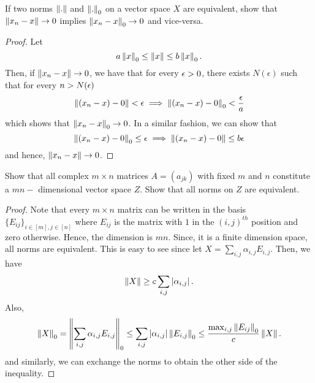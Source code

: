     \begin{question}
        If two norms $\left\lVert . \right\rVert$ and $\left\lVert . \right\rVert_0$ on a vector space $X$ are equivalent, show that $\left\lVert x_n - x \right\rVert \rightarrow 0$ implies $\left\lVert x_n - x \right\rVert_0 \rightarrow 0$ and vice-versa.
        \label{section2.4-9}
    \end{question}
    \begin{proof}
        Let
        \[a \left\lVert x \right\rVert_0 \leq \left\lVert x \right\rVert \leq b \left\lVert x \right\rVert_0.\]
        Then, if $\left\lVert x_n  -x \right\rVert \rightarrow 0$, we have that for every $\epsilon > 0$, there exists $N(\epsilon)$ such that for every $n > N(\epsilon)$
        \[\left\lVert (x_n-x) - 0 \right\rVert < \epsilon \implies \left\lVert (x_n-x) - 0 \right\rVert_0 < \frac{\epsilon}{a}\]
        which shows that $\left\lVert x_n - x \right\rVert_0 \rightarrow 0$. In a similar fashion, we can show that
        \[\left\lVert (x_n-x) - 0 \right\rVert_0 \leq \epsilon \implies \left\lVert (x_n - x) - 0 \right\rVert \leq b\epsilon\]
         and hence, $\left\lVert x_n - x \right\rVert \rightarrow 0$.
         
\end{proof}

\begin{question}
    Show that all complex $m \times n$ matrices $A = (a_{jk})$ with fixed $m$ and $n$ constitute a $mn-$ dimensional vector space $Z$. Show that all norms on $Z$ are equivalent.
    \label{section2.4-10}
\end{question}
\begin{proof}
    Note that every $m \times n$ matrix can be written in the basis $\{E_{ij}\}_{i \in [m] , j \in [n]}$ where $E_{ij}$ is the matrix with $1$ in the $(i,j)^{th}$ position and zero otherwise. Hence, the dimension is $mn$. Since, it is a finite dimension space, all norms are equivalent. This is easy to see since let $X = \sum_{i,j}\alpha_{i,j}E_{i,j}$. Then, we have
    \[\left\lVert X \right\rVert \geq c \sum_{i,j} \left\lvert \alpha_{i,j} \right\rvert.\]
    Also, 
    \[\left\lVert X \right\rVert_0 = \left\lVert \sum_{i,j} \alpha_{i,j} E_{i,j} \right\rVert_0 \leq \sum_{i,j} \left\lvert \alpha_{i,j} \right\rvert \left\lVert E_{i,j} \right\rVert_0 \leq  \frac{\max_{i,j}\left\lVert E_{ij} \right\rVert_0}{c} \left\lVert X \right\rVert. \]
    and similarly, we can exchange the norms to obtain the other side of the inequality.
\end{proof}